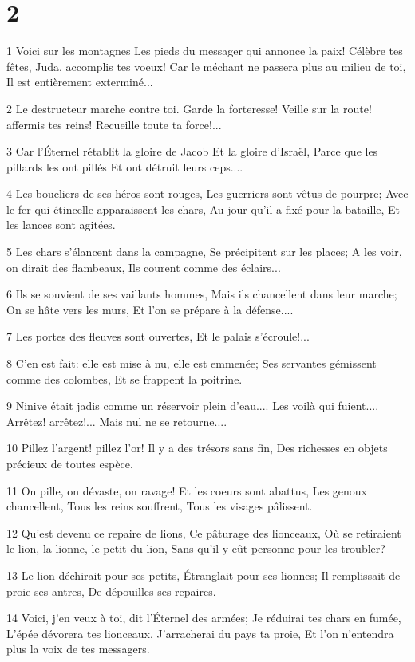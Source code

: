 \chapter{2}

\par 1 Voici sur les montagnes Les pieds du messager qui annonce la paix! Célèbre tes fêtes, Juda, accomplis tes voeux! Car le méchant ne passera plus au milieu de toi, Il est entièrement exterminé...
\par 2 Le destructeur marche contre toi. Garde la forteresse! Veille sur la route! affermis tes reins! Recueille toute ta force!...
\par 3 Car l'Éternel rétablit la gloire de Jacob Et la gloire d'Israël, Parce que les pillards les ont pillés Et ont détruit leurs ceps....
\par 4 Les boucliers de ses héros sont rouges, Les guerriers sont vêtus de pourpre; Avec le fer qui étincelle apparaissent les chars, Au jour qu'il a fixé pour la bataille, Et les lances sont agitées.
\par 5 Les chars s'élancent dans la campagne, Se précipitent sur les places; A les voir, on dirait des flambeaux, Ils courent comme des éclairs...
\par 6 Ils se souvient de ses vaillants hommes, Mais ils chancellent dans leur marche; On se hâte vers les murs, Et l'on se prépare à la défense....
\par 7 Les portes des fleuves sont ouvertes, Et le palais s'écroule!...
\par 8 C'en est fait: elle est mise à nu, elle est emmenée; Ses servantes gémissent comme des colombes, Et se frappent la poitrine.
\par 9 Ninive était jadis comme un réservoir plein d'eau.... Les voilà qui fuient.... Arrêtez! arrêtez!... Mais nul ne se retourne....
\par 10 Pillez l'argent! pillez l'or! Il y a des trésors sans fin, Des richesses en objets précieux de toutes espèce.
\par 11 On pille, on dévaste, on ravage! Et les coeurs sont abattus, Les genoux chancellent, Tous les reins souffrent, Tous les visages pâlissent.
\par 12 Qu'est devenu ce repaire de lions, Ce pâturage des lionceaux, Où se retiraient le lion, la lionne, le petit du lion, Sans qu'il y eût personne pour les troubler?
\par 13 Le lion déchirait pour ses petits, Étranglait pour ses lionnes; Il remplissait de proie ses antres, De dépouilles ses repaires.
\par 14 Voici, j'en veux à toi, dit l'Éternel des armées; Je réduirai tes chars en fumée, L'épée dévorera tes lionceaux, J'arracherai du pays ta proie, Et l'on n'entendra plus la voix de tes messagers.

